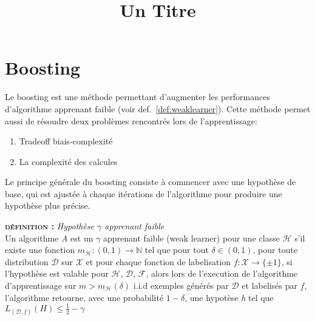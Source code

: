 \documentclass[12pt, a4paper]{article}
\title{Un Titre}
\newcounter{NoDef}
\newenvironment{definition}[1]{
    \refstepcounter{NoDef}
    
    
    \vspace{0.3cm}
    \textbf{\textsc{définition \theNoDef:}} \textit{#1}\\
}{

\vspace{0.3cm}
}
\begin{document}
\maketitle

\section{Boosting}

    Le boosting est une méthode permettant d'augmenter les performances\\ d'algorithme apprenant
    faible (voir def.~\ref{def:weaklearner}). Cette méthode permet aussi de résoudre deux problèmes
    rencontrés lors de l'apprentissage:
    \begin{enumerate}
        \item Tradeoff biais-complexité
        \item La complexité des calcules
    \end{enumerate}
    Le principe générale du boosting consiste à commencer avec une hypothèse de base,
    qui est ajustée à chaque itérations de l'algorithme pour produire une hypothèse plus précise.


    \begin{definition}{Hypothèse $\gamma$ apprenant faible}
    Un algorithme \textit{A} est un $\gamma$ apprenant faible (weak learner) pour une classe
    $\mathcal{H}$ s'il existe une fonction $m_{\mathcal{H}}: (0,1) \rightarrow \mathbb{N}$ tel que 
    pour tout $\delta \in (0,1)$, pour toute distribution $\mathcal{D}$ sur $\mathcal{X}$ et pour
    chaque fonction de labelisation $f:\mathcal{X} \rightarrow \{\pm 1\}$, si l'hypothèse est
    valable pour $\mathcal{H}$, $\mathcal{D}$, $\mathcal{F}$, alors lors de l'execution de l'algorithme
    d'apprentissage sur $m > m_{\mathcal{H}}(\delta)$ i.i.d exemples générés par $\mathcal{D}$ et
    labelisés par $f$, l'algorithme retourne, avec une probabilité $1- \delta$, une hypotèse
    \textit{h} tel que $L_{(\mathcal{D}, f)}(H) \leq \frac{1}{2} - \gamma$
    \label{def:weaklearner}
    \end{definition}
\end{document}
